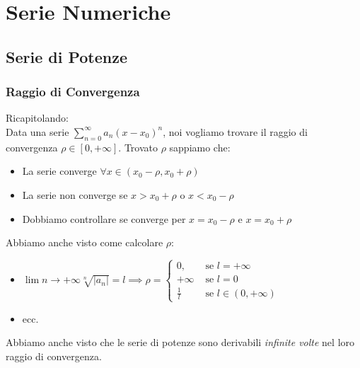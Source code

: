 


\chapter{Serie Numeriche}\label{chap:serie_numeriche}
\section{Serie di Potenze}\label{sec:serie_di_potenze}
\subsection{Raggio di Convergenza}\label{sub:raggio_di_convergenza}
Ricapitolando:\\
Data una serie $\sum_{n=0}^{\infty}a_n(x-x_0)^n$, noi vogliamo trovare il raggio di convergenza $\rho\in[0,+\infty]$. Trovato $\rho$ sappiamo che:

\begin{itemize}
  \item La serie converge $\forall x\in(x_0-\rho,x_0+\rho)$
  \item La serie non converge se $x>x_0+\rho$ o $x<x_0-\rho$
  \item Dobbiamo controllare se converge per $x=x_0-\rho$ e $x=x_0+\rho$
\end{itemize}

Abbiamo anche visto come calcolare $\rho$:
\begin{itemize}
  \item $\lim{n\to+\infty}\sqrt[n]{|a_n|} = l \implies \rho=\begin{cases}
    0, &\text{ se }l=+\infty\\
    +\infty &\text{ se }l=0\\
    \frac{1}{l} &\text{ se }l\in(0,+\infty)
  \end{cases}$
\item ecc.
\end{itemize}

Abbiamo anche visto che le serie di potenze sono derivabili \textit{infinite volte} nel loro raggio di convergenza.

